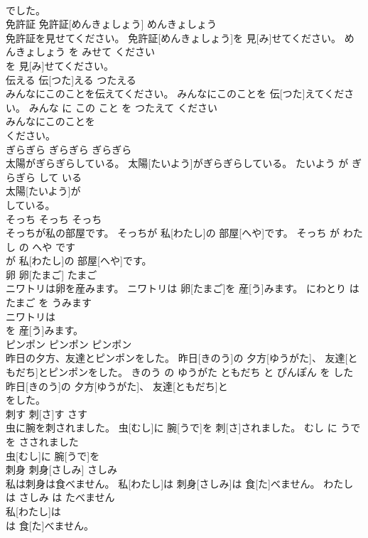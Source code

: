\documentclass[8pt]{extreport}
\begin{document}
\begin{CJK}{UTF8}{min}
\\	でした。			
\\	免許証	免許証[めんきょしょう]	めんきょしょう	
\\	免許証を見せてください。	免許証[めんきょしょう]を 見[み]せてください。	めんきょしょう を みせて ください	
\\	を 見[み]せてください。			
\\	伝える	伝[つた]える	つたえる	
\\	みんなにこのことを伝えてください。	みんなにこのことを 伝[つた]えてください。	みんな に この こと を つたえて ください	
\\	みんなにこのことを
\\	ください。			
\\	ぎらぎら	ぎらぎら	ぎらぎら	
\\	太陽がぎらぎらしている。	太陽[たいよう]がぎらぎらしている。	たいよう が ぎらぎら して いる	
\\	太陽[たいよう]が
\\	している。			
\\	そっち	そっち	そっち	
\\	そっちが私の部屋です。	そっちが 私[わたし]の 部屋[へや]です。	そっち が わたし の へや です	
\\	が 私[わたし]の 部屋[へや]です。			
\\	卵	卵[たまご]	たまご	
\\	ニワトリは卵を産みます。	ニワトリは 卵[たまご]を 産[う]みます。	にわとり は たまご を うみます	
\\	ニワトリは
\\	を 産[う]みます。			
\\	ピンポン	ピンポン	ピンポン	
\\	昨日の夕方、友達とピンポンをした。	昨日[きのう]の 夕方[ゆうがた]、 友達[ともだち]とピンポンをした。	きのう の ゆうがた ともだち と ぴんぽん を した	
\\	昨日[きのう]の 夕方[ゆうがた]、 友達[ともだち]と
\\	をした。			
\\	刺す	刺[さ]す	さす	
\\	虫に腕を刺されました。	虫[むし]に 腕[うで]を 刺[さ]されました。	むし に うで を さされました	
\\	虫[むし]に 腕[うで]を
\\	刺身	刺身[さしみ]	さしみ	
\\	私は刺身は食べません。	私[わたし]は 刺身[さしみ]は 食[た]べません。	わたし は さしみ は たべません	
\\	私[わたし]は
\\	は 食[た]べません。			

\end{CJK}
\end{document}
